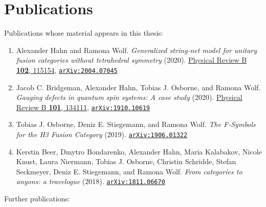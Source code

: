 \chapter*{Publications}

Publications whose material appears in this thesis:\\

\begin{enumerate}
	\item Alexander Hahn and Ramona Wolf. \emph{Generalized string-net model for unitary fusion categories without tetrahedral symmetry} (2020). 
	\href{https://doi.org/10.1103/PhysRevB.102.115154}{Physical Review B \textbf{102}, 115154},  \href{https://arxiv.org/abs/2004.07045}{\texttt{arXiv:2004.07045}}\vspace{10pt}
	
	\item Jacob C. Bridgeman, Alexander Hahn, Tobias J. Osborne, and Ramona Wolf. \emph{Gauging defects in quantum spin systems: A case study} (2020). \href{https://doi.org/10.1103/PhysRevB.101.134111}{Physical Review B \textbf{101}, 134111}, \href{https://arxiv.org/abs/1910.10619}{\texttt{arXiv:1910.10619}}\vspace{10pt}

	\item Tobias J. Osborne, Deniz E. Stiegemann, and Ramona Wolf. \emph{The F-Symbols for the H3 Fusion Category} (2019). \href{https://arxiv.org/abs/1906.01322}{\texttt{arXiv:1906.01322}}\vspace{10pt}
	
	\item Kerstin Beer, Dmytro Bondarenko, Alexander Hahn, Maria Kalabakov, Nicole Knust, Laura Niermann, Tobias J. Osborne, Christin Schridde, Stefan Seckmeyer, Deniz E. Stiegemann, and Ramona Wolf. \emph{From categories to anyons: a travelogue} (2018). \href{https://arxiv.org/abs/1811.06670}{\texttt{arXiv:1811.06670}}
\end{enumerate}
\vspace{25pt}

Further publications:\\


